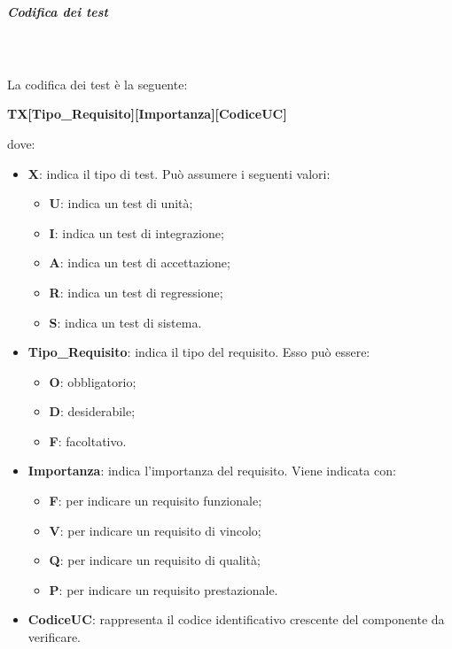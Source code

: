 \subparagraph*{Codifica dei test} \mbox{} \\ \mbox{} \\
La codifica dei test è la seguente: \\
\centerline{\textbf{TX[Tipo\_Requisito][Importanza][CodiceUC]}}
dove: \begin{itemize}
\item \textbf{X}: indica il tipo di test. Può assumere i seguenti valori: \begin{itemize}
\item \textbf{U}: indica un test di unità;
\item \textbf{I}: indica un test di integrazione;
\item \textbf{A}: indica un test di accettazione;
\item \textbf{R}: indica un test di regressione;
\item \textbf{S}: indica un test di sistema.
\end{itemize} 
\item \textbf{Tipo\_Requisito}: indica il tipo del requisito. Esso può essere: \begin{itemize}
\item \textbf{O}: obbligatorio;
\item \textbf{D}: desiderabile;
\item \textbf{F}: facoltativo.
\end{itemize}
\item \textbf{Importanza}: indica l'importanza del requisito. Viene indicata con: \begin{itemize}
\item \textbf{F}: per indicare un requisito funzionale;
\item \textbf{V}: per indicare un requisito di vincolo;
\item \textbf{Q}: per indicare un requisito di qualità;
\item \textbf{P}: per indicare un requisito prestazionale.
\end{itemize}
\item \textbf{CodiceUC}: rappresenta il codice identificativo crescente del componente da verificare.
\end{itemize}

